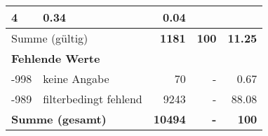 \begin{longtable}{lXrrr}
       \num{4} &
       \num[round-mode=places,round-precision=2]{0.34} &
         \num[round-mode=places,round-precision=2]{0.04} \\
     \midrule
     \multicolumn{2}{l}{Summe (gültig)} &
       \textbf{\num{1181}} &
     \textbf{\num{100}} &
       \textbf{\num[round-mode=places,round-precision=2]{11.25}} \\
     \multicolumn{5}{l}{\textbf{Fehlende Werte}}\\
       -998 &
       keine Angabe &
         \num{70} &
        - &
         \num[round-mode=places,round-precision=2]{0.67} \\
       -989 &
       filterbedingt fehlend &
         \num{9243} &
        - &
         \num[round-mode=places,round-precision=2]{88.08} \\
     \midrule
     \multicolumn{2}{l}{\textbf{Summe (gesamt)}} &
          \textbf{\num{10494}} &
        \textbf{-} &
        \textbf{\num{100}} \\
     \bottomrule
     \end{longtable}
     
